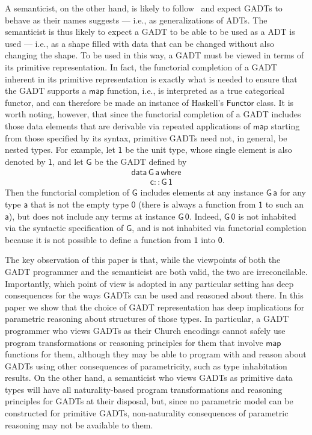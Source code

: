 \documentclass[acmsmall,screen,review,anonymous]{acmart}
\theoremstyle{definition}
\begin{document}
A semanticist, on the other hand, is likely to follow~\cite{bfss90}
and expect GADTs to behave as their names suggests --- i.e., as
generalizations of ADTs. The semanticist is thus likely to expect a
GADT to be able to be used as a ADT is used --- i.e., as a shape
filled with data that can be changed without also changing the
shape. To be used in this way, a GADT must be viewed in terms of its
primitive representation. In fact, the functorial completion of a GADT
inherent in its primitive representation is exactly what is needed to
ensure that the GADT supports a $\mathsf{map}$ function, i.e., is
interpreted as a true categorical functor, and can therefore be made
an instance of Haskell's $\mathsf{Functor}$ class. It is worth noting,
however, that since the functorial completion of a GADT includes those
data elements that are derivable via repeated applications of
$\mathsf{map}$ starting from those specified by its syntax, primitive
GADTs need not, in general, be nested types. For example, let
$\mathsf{1}$ be the unit type, whose single element is also denoted by
$\mathsf{1}$, and let $\mathsf{G}$ be the GADT defined by
\begin{equation}\label{eq:G}
\begin{array}{l}
\mathsf{data\,G\,a\,where}\\
\mathsf{\;\;\;\;\;\;\;\;c :: G\,1}
\end{array}
\end{equation}
Then the functorial completion of $\mathsf{G}$ includes elements at
any instance $\mathsf{G\,a}$ for any type $\mathsf{a}$ that is not the
empty type $\mathsf{0}$ (there is always a function from $\mathsf{1}$
to such an $\mathsf{a}$), but does not include any terms at instance
$\mathsf{G\,0}$. Indeed, $\mathsf{G\,0}$ is not inhabited via the
syntactic specification of $\mathsf{G}$, and is not inhabited via
functorial completion because it is not possible to define a function
from $\mathsf{1}$ into $\mathsf{0}$.

The key observation of this paper is that, while the viewpoints of
both the GADT programmer and the semanticist are both valid, the two
are irreconcilable. Importantly, which point of view is adopted in any
particular setting has deep consequences for the ways GADTs can be
used and reasoned about there. In this paper we show that the choice
of GADT representation has deep implications for parametric reasoning
about structures of those types. In particular, a GADT programmer who
views GADTs as their Church encodings cannot safely use program
transformations or reasoning principles for them that involve
$\mathsf{map}$ functions for them, although they may be able to
program with and reason about GADTs using other consequences of
parametricity, such as type inhabitation results. On the other hand, a
semanticist who views GADTs as primitive data types will have all
naturality-based program transformations and reasoning principles for
GADTs at their disposal, but, since no parametric model can be
constructed for primitive GADTs, non-naturality consequences of
parametric reasoning may not be available to them.
\end{document}
